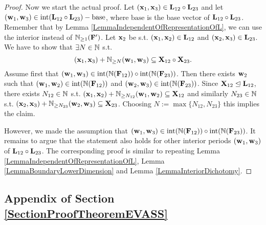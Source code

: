 \begin{proof}
Now we start the actual proof. Let \((\mathbf{x}_1, \mathbf{x}_3) \in \mathbf{L}_{12} \circ \mathbf{L}_{23}\) and let \((\mathbf{w}_1, \mathbf{w}_3) \in \operatorname{int}(\mathbf{L}_{12} \circ \mathbf{L}_{23})-\text{base}\), where \(\text{base}\) is the base vector of \(\mathbf{L}_{12} \circ \mathbf{L}_{23}\). Remember that by Lemma \ref{LemmaIndependentOfRepresentationOfL}, we can use the interior instead of \(\mathbb{N}_{\geq 1}(\mathbf{F}')\). Let \(\mathbf{x}_2\) be s.t. \((\mathbf{x}_1, \mathbf{x}_2) \in \mathbf{L}_{12}\) and \((\mathbf{x}_2, \mathbf{x}_3) \in \mathbf{L}_{23}\). We have to show that \(\exists N \in \mathbb{N}\) s.t. 
\[(\mathbf{x}_1 , \mathbf{x}_3)+\mathbb{N}_{\geq N}(\mathbf{w}_1,\mathbf{w}_3) \subseteq \mathbf{X}_{12} \circ \mathbf{X}_{23}.\]
Assume first that \((\mathbf{w}_1, \mathbf{w}_3) \in \operatorname{int}(\mathbb{N}(\mathbf{F}_{12})) \circ \operatorname{int}(\mathbb{N}(\mathbf{F}_{23}))\). Then there exists \(\mathbf{w}_2\) such that \((\mathbf{w}_1, \mathbf{w}_2) \in \operatorname{int}(\mathbb{N}(\mathbf{F}_{12}))\) and \((\mathbf{w}_2, \mathbf{w}_3) \in \operatorname{int}(\mathbb{N}(\mathbf{F}_{23}))\). Since \(\mathbf{X}_{12} \trianglelefteq \mathbf{L}_{12}\), there exists \(N_{12} \in \mathbb{N}\) s.t. \((\mathbf{x}_1, \mathbf{x}_2)+\mathbb{N}_{\geq N_{12}}(\mathbf{w}_1, \mathbf{w}_2) \subseteq \mathbf{X}_{12}\) and similarly \(N_{23} \in \mathbb{N}\) s.t. \((\mathbf{x}_2, \mathbf{x}_3)+\mathbb{N}_{\geq N_{23}}(\mathbf{w}_2, \mathbf{w}_3) \subseteq \mathbf{X}_{23}\). Choosing \(N:=\max \{N_{12}, N_{23}\}\) this implies the claim.

However, we made the assumption that \((\mathbf{w}_1, \mathbf{w}_3) \in \operatorname{int}(\mathbb{N}(\mathbf{F}_{12})) \circ \operatorname{int}(\mathbb{N}(\mathbf{F}_{23}))\). It remains to argue that the statement also holds for other interior periods \((\mathbf{w}_1, \mathbf{w}_3)\) of \(\mathbf{L}_{12} \circ \mathbf{L}_{23}\). The corresponding proof is similar to repeating Lemma \ref{LemmaIndependentOfRepresentationOfL}, Lemma \ref{LemmaBoundaryLowerDimension} and Lemma \ref{LemmaInteriorDichotomy}.
\end{proof}





















\subsection{Appendix of Section \ref{SectionProofTheoremEVASS}}

